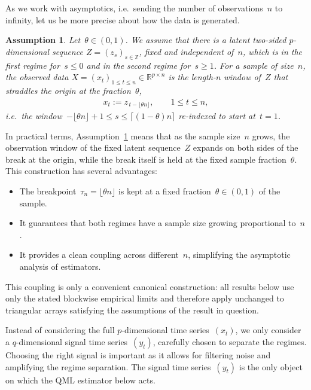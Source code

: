 \documentclass[10pt, letterpaper]{amsart}
\newtheorem{assumption}[theorem]{Assumption}
\begin{document}
As we work with asymptotics, i.e.~sending the number of observations~$n$ to infinity, let us be more precise about how the data is generated. 
\begin{assumption}\label{ass:generating_data}
    Let~$\theta \in (0, 1)$. We assume that there is a latent two-sided $p$-dimensional sequence $Z= (z_{s})_{s \in \mathbb{Z}}$, fixed and independent of~$n$, which is in the first regime for~$s \leq 0$ and in the second regime for~$s \geq 1$. For a sample of size~$n$, the observed data $X= (x_t)_{1 \leq t \leq n} \in \mathbb R^{p\times n}$ is the length-$n$ window of~$Z$ that straddles the origin at the fraction~$\theta$,
    \begin{align}
        x_t := z_{\,t - \lfloor \theta n \rfloor}, \qquad 1 \leq t \leq n,
    \end{align}
    i.e.~the window~$-\lfloor\theta n\rfloor+1 \leq s \leq \lceil(1-\theta)n\rceil$ re-indexed to start at~$t=1$.
\end{assumption}
In practical terms, Assumption~\ref{ass:generating_data} means that as the sample size~$n$ grows, the observation window of the fixed latent sequence~$Z$ expands on both sides of the break at the origin, while the break itself is held at the fixed sample fraction~$\theta$. This construction has several advantages:
\begin{itemize}
    \item The breakpoint~$\tau_n = \lfloor \theta n\rfloor$ is kept at a fixed fraction~$\theta \in (0,1)$ of the sample.
    \item It guarantees that both regimes have a sample size growing proportional to~$n$.
    \item It provides a clean coupling across different~$n$, simplifying the asymptotic analysis of estimators.
\end{itemize}
This coupling is only a convenient canonical construction: all results below use only the stated blockwise empirical limits and therefore apply unchanged to triangular arrays satisfying the assumptions of the result in question.

 Instead of considering the full $p$-dimensional time series~$(x_t)$, we only consider a $q$-dimensional signal time series~$(y_t)$, carefully chosen to separate the regimes. Choosing the right signal is important as it allows for filtering noise and amplifying the regime separation. The signal time series~$(y_t)$ is the only object on which the QML estimator below acts.
\end{document}
